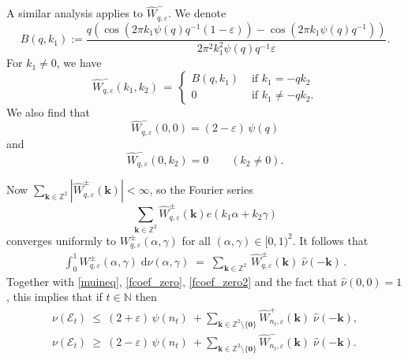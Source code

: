 \documentclass[12pt, reqno]{amsart}
\theoremstyle{definition}
\theoremstyle{remark}
\numberwithin{equation}{section}
\def\alp{{\alpha}} \def\bfalp{{\boldsymbol \alpha}}
\def\eps{\varepsilon}
\def\leq{\leqslant}
\def\geq{\geqslant}
\def \bN {\mathbb N}
\def \bZ {\mathbb Z}
\def \cE {\mathcal E}
\begin{document}
A similar analysis applies to $\widehat{W}_{q,\eps}^-$. We denote
\[
B(q,k_1):=\dfrac{q\left(\cos(2\pi k_1\psi(q)q^{-1}(1-\varepsilon))-\cos(2\pi k_1\psi(q)q^{-1}) \right)}{2\pi^2 k_1^2\psi(q)q^{-1}\varepsilon}.
\]
For $k_1\neq 0$, we have
\begin{equation} \label{fcoef2}
\widehat{W}_{q,\varepsilon}^-(k_1,k_2)\, =\,
\begin{cases}
B(q,k_1)  &\text{\  if   }  k_1= - q k_2 \\[3ex]
0 & \text{\  if   }  k_1\neq - q k_2.
\end{cases}
\end{equation}
We also find that
\begin{equation} \label{fcoef_zero2}
\widehat{W}_{q,\varepsilon}^-(0,0)  = (2 -  \varepsilon)\, \psi(q)  
\end{equation}
and
\begin{equation} \label{fcoef_zero_nonzero2}
\widehat{W}_{q,\varepsilon}^-(0,k_2)  = 0  
\qquad (k_2 \ne 0).
\end{equation}

Now $\sum\limits_{\mathbf{k} \in \bZ^2}| \widehat{W}_{q,\varepsilon}^{\pm}(\mathbf{k} )  |  < \infty $, so the Fourier series
\[ \sum_{\mathbf{k} \in \bZ^2}\widehat{W}_{q,\varepsilon}^{\pm}(\mathbf{k}) e( k_1 \alp + k_2 \gamma ) \]
converges uniformly to $W_{q,\varepsilon}^{\pm}(\alp,\gamma)$ for all $(\alp,\gamma) \in [0,1)^2$. It  follows that
\begin{eqnarray*}
\int_0^1 W_{q,\varepsilon}^{\pm}(\alp,\gamma)  \; \mathrm{d}\nu(\alp,\gamma) \; =  \;  \sum_{\mathbf{k}\in \bZ^2} \, \widehat{W}_{q,\varepsilon}^{\pm}(\mathbf{k})  \;  \widehat{\nu}(-\mathbf{k})   \, .
\end{eqnarray*}
Together with \eqref{muineq}, \eqref{fcoef_zero},  \eqref{fcoef_zero2} and the fact that $\widehat{\nu}(0,0)=1$, this implies that if $t \in \bN$ then
\begin{equation} \label{mu_ie}
\begin{array}{ll}
\nu( \cE_t)  \  \leq \ (2+\varepsilon) \, \psi(n_t)  \  + \displaystyle{\sum_{\mathbf{k} \in \bZ^2 \setminus \{\mathbf{0} \} }}\widehat{W}_{n_t,\varepsilon}^{+}(\mathbf{k})  \; \widehat{\nu}(-\mathbf{k}),
\\[5ex]
\nu( \cE_t)  \ \geq  \  (2-\varepsilon) \,  \psi(n_t)   \ + \displaystyle{\sum_{\mathbf{k} \in \bZ^2 \setminus \{\mathbf{0} \} }}  \widehat{W}_{n_t,\varepsilon}^{-}(\mathbf{k}) \; \widehat{\nu}(-\mathbf{k}).
\end{array}
\end{equation}
\end{document}
